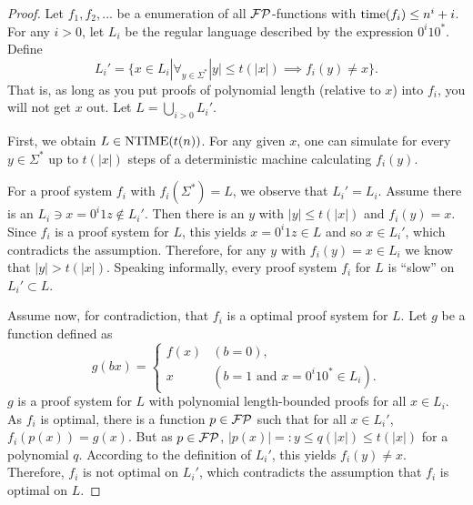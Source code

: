   \begin{proof}
    Let \(f_1, f_2, ...\) be a enumeration of all \(\mathcal{FP}\)-functions with \(\operatorname{time}(f_i) \leq n^i + i\). 
    For any \(i > 0\), let \(L_i\) be the regular language described by the expression \(0^i10^*\). Define
      \[ L_i' = \{ x \in L_i | \forall_{ y \in \Sigma^* } |y| \leq t(|x|) \implies f_i(y) \neq x \}. \]
    That is, as long as you put proofs of polynomial length (relative to \(x\)) into \(f_i\), you will not get \(x\) out.
    Let \(L = \bigcup_{i > 0} L_i'\).

    First, we obtain \(L \in \text{NTIME}(t(n))\). For any given \(x\), one can simulate for every \(y \in \Sigma^*\) up to \(t(|x|)\) steps of a deterministic machine calculating \(f_i(y)\).

    For a proof system \(f_i\) with \(f_i(\Sigma^*) = L\), we observe that \(L_i' = L_i\). Assume there is an \(L_i \ni x = 0^i1z \notin L_i'\). Then there is an \(y\) with \(|y| \leq t(|x|)\) and \(f_i(y) = x\). Since \(f_i\) is a proof system for \(L\), this yields \(x = 0^i1z \in L\) and so \(x \in L_i'\), which contradicts the assumption. Therefore, for any \(y\) with \(f_i(y) = x \in L_i\) we know that \(|y| > t(|x|)\). Speaking informally, every proof system \(f_i\) for \(L\) is ``slow'' on \(L_i' \subset L\).

    Assume now, for contradiction, that \(f_i\) is a optimal proof system for \(L\). Let \(g\) be a function defined as
      \[ g(bx) = \begin{cases}
                  f(x) & (b = 0), \\
                  x & (b = 1 \text{ and } x = 0^i10^* \in L_i).
                 \end{cases} \]
    \(g\) is a proof system for \(L\) with polynomial length-bounded proofs for all \(x \in L_i\). As \(f_i\) is optimal, there is a function \(p \in \mathcal{FP}\) such that for all \(x \in L_i'\), \(f_i(p(x)) = g(x)\). But as \(p \in \mathcal{FP}\), \(|p(x)| =: y \leq q(|x|) \leq t(|x|)\) for a polynomial \(q\). According to the definition of \(L_i'\), this yields \(f_i(y) \neq x\). Therefore, \(f_i\) is not optimal on \(L_i'\), which contradicts the assumption that \(f_i\) is optimal on \(L\).
  \end{proof}


